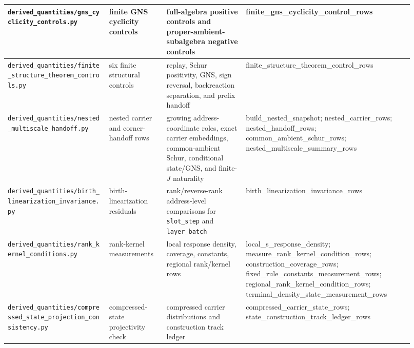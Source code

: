 \documentclass[11pt]{article}
\theoremstyle{remark}
\newcommand{\code}[1]{\texttt{#1}}
\numberwithin{equation}{section}
\begin{document}
\begin{longtable}{>{\raggedright\arraybackslash}p{0.23\linewidth}>{\raggedright\arraybackslash}p{0.13\linewidth}>{\raggedright\arraybackslash}p{0.18\linewidth}>{\raggedright\arraybackslash}p{0.38\linewidth}}
\hline
\code{derived\_\allowbreak{}quantities/gns\_\allowbreak{}cyclicity\_\allowbreak{}controls.py} & finite GNS cyclicity controls & full-algebra positive controls and proper-ambient-subalgebra negative controls & finite\_\allowbreak{}gns\_\allowbreak{}cyclicity\_\allowbreak{}control\_\allowbreak{}rows\\\hline
\code{derived\_\allowbreak{}quantities/finite\_\allowbreak{}structure\_\allowbreak{}theorem\_\allowbreak{}controls.py} & six finite structural controls & replay, Schur positivity, GNS, sign reversal, backreaction separation, and prefix handoff & finite\_\allowbreak{}structure\_\allowbreak{}theorem\_\allowbreak{}control\_\allowbreak{}rows\\\hline
\code{derived\_\allowbreak{}quantities/nested\_\allowbreak{}multiscale\_\allowbreak{}handoff.py} & nested carrier and corner-handoff rows & growing address-coordinate roles, exact carrier embeddings, common-ambient Schur, conditional state/GNS, and finite-\(J\) naturality & build\_\allowbreak{}nested\_\allowbreak{}snapshot; nested\_\allowbreak{}carrier\_\allowbreak{}rows; nested\_\allowbreak{}handoff\_\allowbreak{}rows; common\_\allowbreak{}ambient\_\allowbreak{}schur\_\allowbreak{}rows; nested\_\allowbreak{}multiscale\_\allowbreak{}summary\_\allowbreak{}rows\\\hline
\code{derived\_\allowbreak{}quantities/birth\_\allowbreak{}linearization\_\allowbreak{}invariance.py} & birth-linearization residuals & rank/reverse-rank address-level comparisons for \code{slot\_\allowbreak{}step} and \code{layer\_\allowbreak{}batch} & birth\_\allowbreak{}linearization\_\allowbreak{}invariance\_\allowbreak{}rows\\
\hline
\code{derived\_\allowbreak{}quantities/rank\_\allowbreak{}kernel\_\allowbreak{}conditions.py} & rank-kernel measurements & local response density, coverage, constants, regional rank/kernel rows & local\_\allowbreak{}s\_\allowbreak{}response\_\allowbreak{}density; measure\_\allowbreak{}rank\_\allowbreak{}kernel\_\allowbreak{}condition\_\allowbreak{}rows; construction\_\allowbreak{}coverage\_\allowbreak{}rows; fixed\_\allowbreak{}rule\_\allowbreak{}constants\_\allowbreak{}measurement\_\allowbreak{}rows; regional\_\allowbreak{}rank\_\allowbreak{}kernel\_\allowbreak{}condition\_\allowbreak{}rows; terminal\_\allowbreak{}density\_\allowbreak{}state\_\allowbreak{}measurement\_\allowbreak{}rows\\
\hline
\code{derived\_\allowbreak{}quantities/compressed\_\allowbreak{}state\_\allowbreak{}projection\_\allowbreak{}consistency.py} & compressed-state projectivity check & compressed carrier distributions and construction track ledger & compressed\_\allowbreak{}carrier\_\allowbreak{}state\_\allowbreak{}rows; state\_\allowbreak{}construction\_\allowbreak{}track\_\allowbreak{}ledger\_\allowbreak{}rows\\

\end{longtable}
\end{document}
